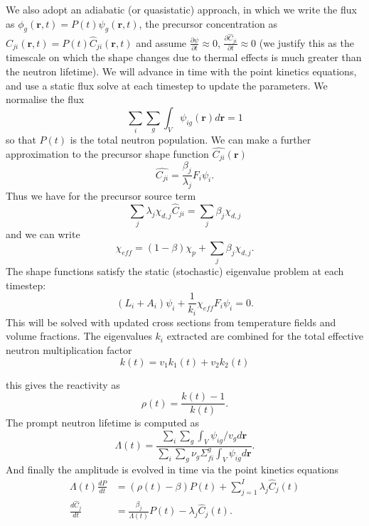 \documentclass[12pt]{article}
\begin{document}
We also adopt an adiabatic (or quasistatic) approach, in which we write the flux as $\phi_g(\mathbf{r},t)=P(t)\psi_g(\mathbf{r},t)$, the precursor concentration as $C_{ji}(\mathbf{r},t)=P(t)\hat{C}_{ji}(\mathbf{r},t) $ and assume $\frac{\partial \psi}{\partial t}\approx 0$, $\frac{\partial \hat{C}_{ji}}{\partial t}\approx 0$ (we justify this as the timescale on which the shape changes due to thermal effects is much greater than the neutron lifetime). We will advance in time with the point kinetics equations, and use a static flux solve at each timestep to update the parameters. We normalise the flux 
\begin{equation}
    \sum_i \sum_g \int _V \psi_{ig}(\mathbf{r})d\mathbf{r}=1
\end{equation}
so that $P(t)$ is the total neutron population. We can make a further approximation to the precursor shape function $\hat{C_{ji}}(\mathbf{r})$
\begin{equation}
    \hat{C_{ji}}=\frac{\beta_j}{\lambda_j}F_i \psi_i.
\end{equation}
Thus we have for the precursor source term
\begin{equation}
    \sum_j \lambda_j \chi_{d,j} \hat{C}_{ji}=\sum_j \beta_j \chi_{d,j}
\end{equation}
and we can write 
\begin{equation}
    \chi_{eff}=(1-\beta)\chi_p +\sum_j \beta_j \chi_{d,j}.
\end{equation}
The shape functions satisfy the static (stochastic) eigenvalue problem at each timestep: 
\begin{equation}
    (L_i +A_i) \psi_i +\frac{1}{k_i} \chi_{eff} F_i \psi_i=0.
\end{equation}
This will be solved with updated cross sections from temperature fields and volume fractions. The eigenvalues $k_i$ extracted are combined for the total effective neutron multiplication factor
\begin{equation}
    k(t)=v_1k_1(t)+v_2k_2(t)
\end{equation}

this gives the reactivity as 
\begin{equation}
    \rho(t)= \frac{k(t)-1}{k(t)}.
\end{equation}
The prompt neutron lifetime is computed as 
\begin{equation}
    \Lambda (t)=\frac{\sum_i \sum_g \int_V \psi_{ig}/v_g d\mathbf{r}}{\sum_i \sum_g \nu_g \Sigma_{fi}^g\int_V \psi_{ig} d\mathbf{r}}.
\end{equation}
And finally the amplitude is evolved in time via the point kinetics equations 
\begin{align}
    \Lambda (t)\frac{dP}{dt}&=(\rho(t)-\beta)P(t)+\sum_{j=1}^I\lambda_j \hat{C}_j (t) \label{pk1} \\ 
    \frac{d\hat{C}_j }{dt}&=\frac{\beta_j}{\Lambda (t)} P(t) -\lambda_j \hat{C}_j(t). \label{pk2}
\end{align}
\end{document}
